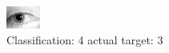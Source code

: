 \begin{figure}[h!]
\begin{center}
\includegraphics[width=0.60\columnwidth]{figures/ID1256_class_4_target_3.png}
\end{center}
\caption{ Classification: 4 actual target: 3}
\label{fig:ID1256_class_4_target_3}
\end{figure}
